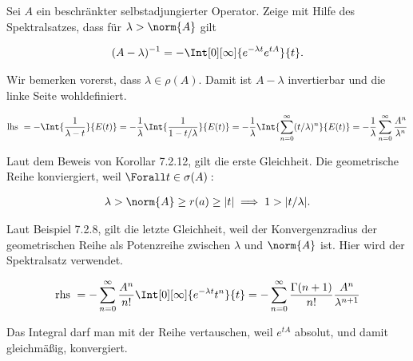 \begin{exercise}[37/3]

Sei $A$ ein beschränkter selbstadjungierter Operator.
Zeige mit Hilfe des Spektralsatzes, dass für $\lambda > \norm{A}$ gilt

\begin{align*}
  (A - \lambda)^{-1}
  =
  -\Int[0][\infty]{e^{-\lambda t} e^{t A}}{t}.
\end{align*}

\end{exercise}

\begin{solution}

\phantom{}


Wir bemerken vorerst, dass $\lambda \in \rho(A)$.
Damit ist $A - \lambda$ invertierbar und die linke Seite wohldefiniert.

\begin{align*}
  \text{lhs}~
  =
  -\Int{\frac{1}{\lambda - t}}{E(t)}
  =
  -\frac{1}{\lambda}
  \Int{\frac{1}{1 - t / \lambda}}{E(t)}
  =
  -\frac{1}{\lambda}
  \Int{\sum_{n=0}^\infty (t / \lambda)^n}{E(t)}
  =
  -\frac{1}{\lambda}
  \sum_{n=0}^\infty
  \frac{A^n}{\lambda^n}
\end{align*}


Laut dem Beweis von Korollar 7.2.12, gilt die erste Gleichheit.
Die geometrische Reihe konviergiert, weil $\Forall t \in \sigma(A):$

\begin{align*}
  \lambda > \norm{A} \geq r(a) \geq |t|
  \implies
  1 > |t / \lambda|.
\end{align*}


Laut Beispiel 7.2.8, gilt die letzte Gleichheit, weil der Konvergenzradius der geometrischen Reihe als Potenzreihe zwischen $\lambda$ und $\norm{A}$ ist.
Hier wird der Spektralsatz verwendet.

\begin{align*}
  \text{rhs}~
  =
  -\sum_{n=0}^\infty
  \frac{A^n}{n!}
  \Int[0][\infty]{e^{-\lambda t} t^n}{t}
  =
  -\sum_{n=0}^\infty
  \frac{\Gamma(n+1)}{n!}
  \frac{A^n}{\lambda^{n+1}}
\end{align*}

Das Integral darf man mit der Reihe vertauschen, weil $e^{t A}$ absolut, und damit gleichmäßig, konvergiert.


\end{solution}
